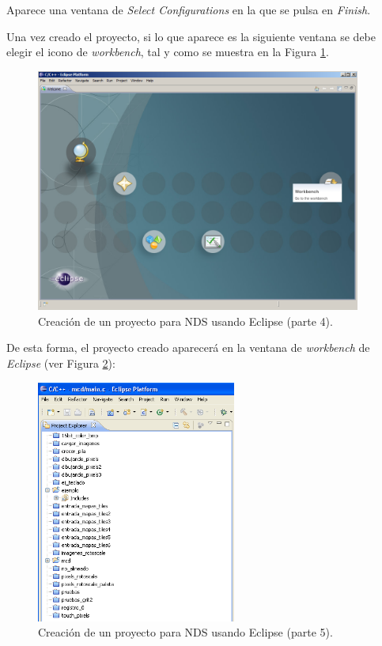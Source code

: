 Aparece una ventana de \textit{Select Configurations} en la que se pulsa en \textit{Finish}. 

Una vez creado el proyecto, si lo que aparece es la siguiente ventana se debe elegir el icono de \textit{workbench}, tal y como se muestra en la Figura \ref{fig_c2_eclipsew}.

\begin{figure}[t]
\centering
\includegraphics[height=8cm]{./Figuras/C2/c2_eclipse-workbench.png}
\caption{Creación de un proyecto para NDS usando Eclipse  (parte 4).}
\label{fig_c2_eclipsew}
\end{figure}

De esta forma, el  proyecto creado aparecerá en la ventana de \textit{workbench} de \textit{Eclipse} (ver Figura \ref{fig_c2_eclipse4}):

\begin{figure}[t]
\centering
\includegraphics[height=8cm]{./Figuras/C2/c2_eclipse4.png}
\caption{Creación de un proyecto para NDS usando Eclipse (parte 5).}
\label{fig_c2_eclipse4}
\end{figure}

